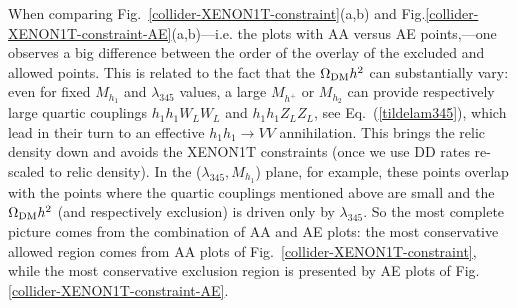 \documentclass[12pt,a4paper]{article}
\begin{document}
When comparing Fig.~\ref{collider-XENON1T-constraint}(a,b) and 
Fig.\ref{collider-XENON1T-constraint-AE}(a,b)---i.e. the plots with AA versus AE points,---one observes
a big difference between the order of the overlay of the excluded and allowed points.
This is related to the fact that the $\Omega_{\rm DM} h^2$ can substantially vary:
even for  fixed $M_{h_1}$ and  $\lambda_{345}$ values,
a large $M_{h^+}$ or $M_{h_2}$  can provide respectively large quartic couplings $h_1 h_1 W_L W_L$ and  $h_1 h_1 Z_L Z_L$, see Eq.~(\ref{tildelam345}), 
which lead in their turn to an effective $h_1 h_1 \to VV$  annihilation. This brings the relic density down and 
avoids the XENON1T constraints (once we use DD rates re-scaled to relic density).
In the ($\lambda_{345},M_{h_1}$) plane, for example, these points overlap with the points 
where the quartic couplings mentioned above are small and the  $\Omega_{\rm DM} h^2$ (and respectively exclusion) is driven only by $\lambda_{345}$. 
So the most complete picture comes from the combination of AA and AE plots:
the most conservative allowed region comes from AA plots of Fig.~\ref{collider-XENON1T-constraint}, while the most conservative exclusion region
is presented by AE plots of Fig.\ref{collider-XENON1T-constraint-AE}.
\end{document}
